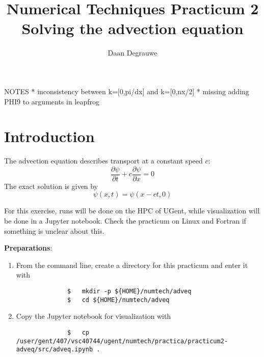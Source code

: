 \documentclass[a4paper]{article}
\title{%
	\bfseries%
	{\large Numerical Techniques Practicum 2}\\[3ex]
	{\Large Solving the advection equation}
}
\author{Daan Degrauwe}
\begin{document}
%
NOTES
* inconsistency between k=[0,pi/dx] and k=[0,nx/2]
* missing adding PHI9 to arguments in leapfrog
%
\maketitle
%
\section{Introduction}
%
\par
The advection equation describes transport at a constant speed $c$:
%
\begin{equation}
	\frac{\partial \psi}{\partial t}+c\frac{\partial \psi}{\partial x}=0
\end{equation}
%
The exact solution is given by
%
\begin{equation}
	\psi(x,t)=\psi(x-ct,0)
\end{equation}
%
\par
For this exercise, runs will be done on the HPC of UGent, while visualization will be done in a Jupyter notebook. Check the practicum on Linux and Fortran if something is unclear about this.
%
\par\vspace*{3ex}
\textbf{Preparations}:
%
\begin{enumerate}
	\item From the command line, create a directory for this practicum and enter it with
		\begin{verbatim}
			  $   mkdir -p ${HOME}/numtech/adveq
			  $   cd ${HOME}/numtech/adveq
		\end{verbatim}
	\item Copy the Jupyter notebook for visualization with
		\begin{verbatim}
			  $   cp /user/gent/407/vsc40744/ugent/numtech/practica/practicum2-adveq/src/adveq.ipynb .
		\end{verbatim}
\end{enumerate}
%
\end{document}
